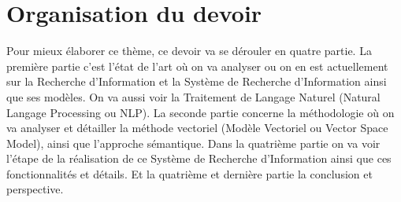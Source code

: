 \section{Organisation du devoir}
Pour mieux élaborer ce thème, ce devoir va se dérouler en quatre partie. La première partie c'est l'état de l'art où on va analyser ou on en est actuellement sur la Recherche d'Information et la Système de Recherche d'Information ainsi que ses modèles. On va aussi voir la Traitement de Langage Naturel (Natural Langage Processing ou NLP). La seconde partie concerne la méthodologie où on va analyser et détailler la méthode vectoriel (Modèle Vectoriel ou Vector Space Model), ainsi que l'approche sémantique. Dans la quatrième partie on va voir l'étape de la réalisation de ce Système de Recherche d'Information ainsi que ces fonctionnalités et détails. Et la quatrième et dernière partie la conclusion et perspective. 